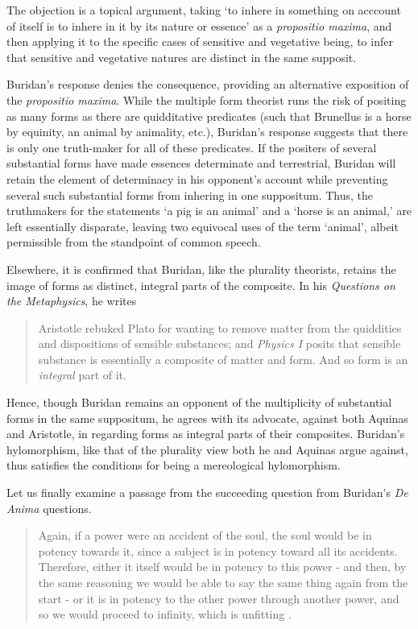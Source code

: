 \documentclass[]{article}
\begin{document}
The objection is a topical argument, taking `to inhere in something on acccount of itself is to inhere in it by its nature or essence' as a \textit{propositio maxima}, and then applying it to the specific cases of sensitive and vegetative being, to infer that sensitive and vegetative natures are distinct in the same supposit. 

Buridan's response denies the consequence, providing an alternative exposition of the \textit{propositio maxima}. While the multiple form theorist runs the risk of positing as many forms as there are quidditative predicates (such that Brunellus is a horse by equinity, an animal by animality, etc.), Buridan's response suggests that there is only one truth-maker for all of these predicates. If the positers of several substantial forms have made essences determinate and terrestrial, Buridan will retain the element of determinacy in his opponent's account while preventing several such substantial forms from inhering in one suppositum. Thus, the truthmakers for the statements `a pig is an animal' and a `horse is an animal,' are left essentially disparate, leaving two equivocal uses of the term `animal', albeit permissible from the standpoint of common speech.

Elsewhere, it is confirmed that Buridan, like the plurality theorists, retains the image of forms as distinct, integral parts of the composite. In his \textit{Questions on the Metaphysics}, he writes 
\begin{quote}
Aristotle rebuked Plato for wanting to remove matter from the quiddities and dispositions of sensible substances; and \textit{Physics I} posits that sensible substance is essentially a composite of matter and form. And so form is an \textit{integral} part of it.\autocite[VII.12, cor.]{BuridanQM}
\end{quote}

Hence, though Buridan remains an opponent of the multiplicity of substantial forms in the same suppositum, he agrees with its advocate, against both Aquinas and Aristotle, in regarding forms as integral parts of their composites. Buridan's hylomorphism, like that of the plurality view both he and Aquinas argue against, thus satisfies the conditions for being a mereological hylomorphism.

Let us finally examine a passage from the succeeding question from Buridan's \textit{De Anima} questions. 

\begin{quote}
	Again, if a power were an accident of the soul, the soul would be in potency towards it, since a subject is in potency toward all its accidents. Therefore, either it itself would be in potency to this power - and then, by the same reasoning we would be able to say the same thing again from the start - or it is in potency to the other power through another power, and so we would proceed to infinity, which is unfitting \autocite[II.5, obj. 14]{BuridanQDA}.
\end{quote}
\end{document}
